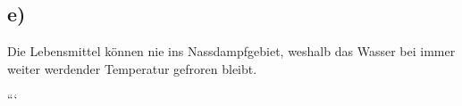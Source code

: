 

\subsection*{e)}
Die Lebensmittel können nie ins Nassdampfgebiet, weshalb das Wasser bei immer weiter werdender Temperatur gefroren bleibt.

```